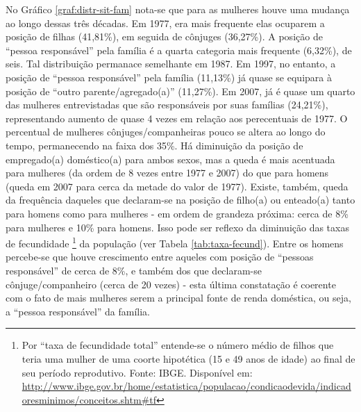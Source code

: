 \clearpage
No Gráfico \ref{graf:distr-sit-fam} nota-se que para as mulheres houve uma mudança ao longo dessas três décadas. Em 1977, era mais frequente elas ocuparem a posição de filhas (41,81\%), em seguida de cônjuges (36,27\%). A posição de ``pessoa responsável'' pela família é a quarta categoria mais frequente (6,32\%), de seis. Tal distribuição permanace semelhante em 1987. Em 1997, no entanto, a posição de ``pessoa responsável'' pela família (11,13\%) já quase se equipara à posição de ``outro parente/agregado(a)'' (11,27\%). Em 2007, já é quase um quarto das mulheres entrevistadas que são responsáveis por suas famílias (24,21\%), representando aumento de quase 4 vezes em relação aos perecentuais de 1977. O percentual de mulheres cônjuges/companheiras pouco se altera ao longo do tempo, permanecendo na faixa dos 35\%. Há diminuição da posição de empregado(a) doméstico(a) para ambos sexos, mas a queda é mais acentuada para mulheres (da ordem de 8 vezes entre 1977 e 2007) do que para homens (queda em 2007 para cerca da metade do valor de 1977). Existe, também, queda da frequência daqueles que declaram-se na posição de filho(a) ou enteado(a) tanto para homens como para mulheres - em ordem de grandeza próxima: cerca de 8\% para mulheres e 10\% para homens. Isso pode ser reflexo da diminuição das taxas de fecundidade
\footnote{Por ``taxa de fecundidade total'' entende-se o número médio de filhos que teria uma mulher de uma coorte hipotética (15 e 49 anos de idade) ao final de seu período reprodutivo. Fonte: IBGE. Disponível em: \url{http://www.ibge.gov.br/home/estatistica/populacao/condicaodevida/indicadoresminimos/conceitos.shtm\#tf}} da população (ver Tabela \ref{tab:taxa-fecund}). Entre os homens percebe-se que houve crescimento entre aqueles com posição de ``pessoas responsável'' de cerca de 8\%, e também dos que declaram-se cônjuge/companheiro (cerca de 20 vezes) - esta última constatação é coerente com o fato de mais mulheres serem a principal fonte de renda doméstica, ou seja, a ``pessoa responsável'' da família.

